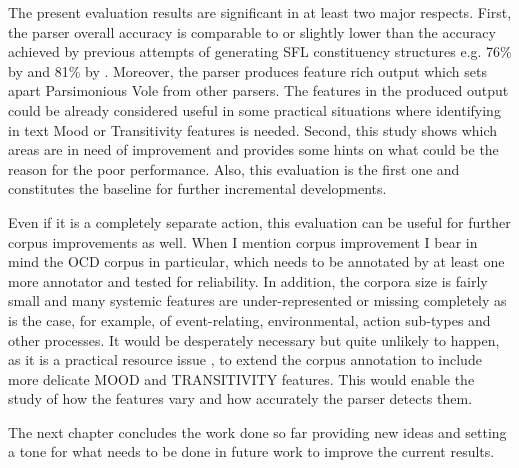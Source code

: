     The present evaluation results are significant in at least two major respects. First, the parser overall accuracy is comparable to or slightly lower than the accuracy achieved by previous attempts of generating SFL constituency structures e.g. 76\% by \citet{Souter1996} and 81\% by \citet{ODonoghue91}.
    Moreover, the parser produces feature rich output which sets apart Parsimonious Vole from other parsers. The features in the produced output could be already considered useful in some practical situations where identifying in text Mood or Transitivity features is needed. 
    Second, this study shows which areas are in need of improvement and provides some hints on what could be the reason for the poor performance. Also, this evaluation is the first one and constitutes the baseline for further incremental developments.
    
    Even if it is a completely separate action, this evaluation can be useful for further corpus improvements as well. When I mention corpus improvement I bear in mind the OCD corpus in particular, which needs to be annotated by at least one more annotator and tested for reliability. In addition, the corpora size is fairly small and many systemic features are under-represented or missing completely as is the case, for example, of event-relating, environmental, action sub-types and other processes. It would be desperately necessary but quite unlikely to happen, as it is a practical resource issue \citep[33]{mcenery2006corpus}, to extend the corpus annotation to include more delicate MOOD and TRANSITIVITY features. This would enable the study of how the features vary and how accurately the parser detects them. 
    
    The next chapter concludes the work done so far providing new ideas and setting a tone for what needs to be done in future work to improve the current results.
